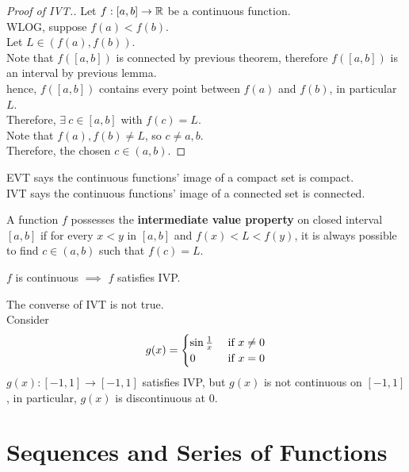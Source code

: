\documentclass[11pt]{article}
\begin{document}
	\begin{proof}[Proof of IVT.]
		Let $f: [a, b] \to \mathbb{R}$ be a continuous function. \\
		WLOG, suppose $f(a) < f(b)$. \\
		Let $L \in (f(a), f(b))$. \\
		Note that $f([a, b])$ is connected by previous theorem, therefore $f([a, b])$ is an interval by previous lemma. \\
		hence, $f([a, b])$ contains every point between $f(a)$ and $f(b)$, in particular $L$. \\
		Therefore, $\exists\ c \in [a, b]$ with $f(c) = L$. \\
		Note that $f(a), f(b) \neq L$, so $c \neq a, b$. \\
		Therefore, the chosen $c \in (a, b)$.
	\end{proof}
	
	\begin{remark}
		EVT says the continuous functions' image of a compact set is compact. \\
		IVT says the continuous functions' image of a connected set is connected.
	\end{remark}
	
	\begin{definition}
		A function $f$ possesses the \textbf{intermediate value property} on closed interval $[a, b]$ if for every $x < y$ in $[a, b]$ and $f(x) < L < f(y)$, it is always possible to find $c \in (a, b)$ such that $f(c) = L$.
	\end{definition}
	
	\begin{theorem}
		$f$ is continuous $\implies$ $f$ satisfies IVP.
	\end{theorem}
	
	\begin{remark}
		The converse of IVT is not true. \\
		Consider 
		\begin{align}
			g(x) = \begin{cases}
				\sin \frac{1}{x} &\text{{ if }} x \neq 0 \\
				0 &\text{{ if }} x = 0
			\end{cases}
		\end{align}
		$g(x): [-1, 1] \to [-1 , 1]$ satisfies IVP, but $g(x)$ is not continuous on $[-1, 1]$, in particular, $g(x)$ is discontinuous at 0.
	\end{remark}
	
	\section{Sequences and Series of Functions}
\end{document}
